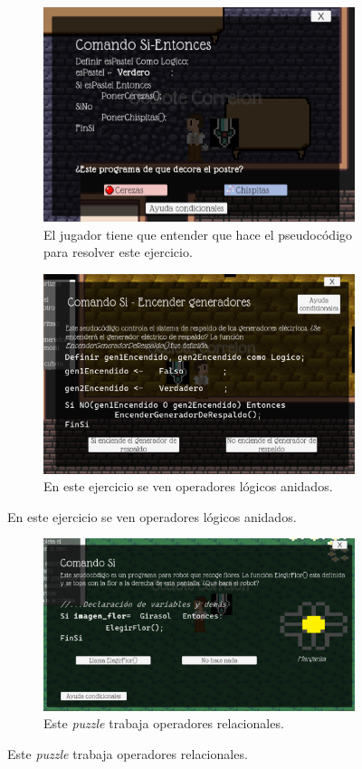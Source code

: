 \begin{itemize}
    \begin{figure}[H]
        \centering
        \begin{subfigure}{\textwidth}
            \centering
            \includegraphics[width=0.5\linewidth]{images/Puzzlecondicional1.png}
            \caption{El jugador tiene que entender que hace el pseudocódigo para resolver este ejercicio.}
            \label{fig:puzzle_condicionales1}
        \end{subfigure}
        \begin{subfigure}{\textwidth}
            \centering
            \includegraphics[width=0.5\linewidth]{images/Puzzlecondicional2.png}
            \caption{En este ejercicio se ven operadores lógicos anidados.}
            \label{fig:puzzle_condicionales2}
        \end{subfigure}
    \end{figure}
        \begin{figure}[H]
        \ContinuedFloat
        \centering
        \begin{subfigure}{\textwidth}
            \centering
            \includegraphics[width=0.5\linewidth]{images/Puzzlecondicional3.png}
            \caption{Este \textit{puzzle} trabaja operadores relacionales.}
            \label{fig:puzzle_condicionale3}

\end{subfigure}
\end{figure}
\end{itemize}
